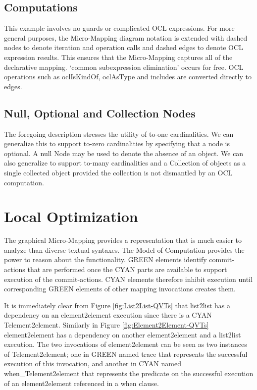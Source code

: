 \documentclass[conference]{IEEEtran}
\begin{document}
\subsection{Computations}

This example involves no guards or complicated OCL expressions. For more general purposes, the Micro-Mapping diagram notation is extended with dashed nodes to denote iteration and operation calls and dashed edges to denote OCL expression results. This ensures that the Micro-Mapping captures all of the declarative mapping. `common subexpression elimination' occurs for free. OCL operations such as oclIsKindOf, oclAsType and includes are converted directly to edges.

\subsection{Null, Optional and Collection Nodes}

The foregoing description stresses the utility of to-one cardinalities. We can generalize this to support to-zero cardinalities by specifying that a node is optional. A null Node may be used to denote the absence of an object. We can also generalize to support to-many cardinalities and a Collection of objects as a single collected object provided the collection is not dismantled by an OCL computation.

\section{Local Optimization}\label{Local Optimization}

The graphical Micro-Mapping provides a representation that is much easier to analyze than diverse textual syntaxes. The Model of Computation provides the power to reason about the functionality. GREEN elements identify commit-actions that are performed once the CYAN parts are available to support execution of the commit-actions. CYAN elements therefore inhibit execution until corresponding GREEN elements of other mapping invocations creates them.%

It is immediately clear from Figure \ref{fig:List2List-QVTs} that list2list has a dependency on an element2element execution since there is a CYAN Telement2element. Similarly in Figure \ref{fig:Element2Element-QVTs} element2element has a dependency on another element2element and a list2list execution. The two invocations of element2element can be seen as two instances of Telement2element; one in GREEN named trace that represents the successful execution of this invocation, and another in CYAN named when\_Telement2element that represents the predicate on the successful execution of an element2element referenced in a when clause.
\end{document}
